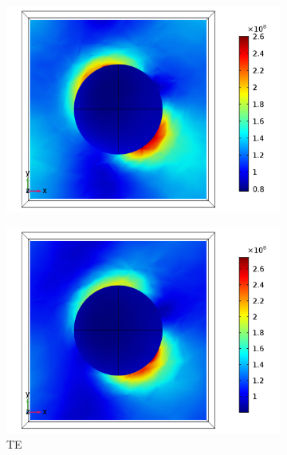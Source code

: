 \begin{figure}[htb!]
    \begin{subfigure}{0.32\textwidth}
        \centering
        \includegraphics[width=\linewidth]{figures/ch4/S5A/FieldDistribution/phi25/z2/Sample5A_TE_Slice@z=+05Rz_wl=350_phi=25.png}
   \end{subfigure}
   \begin{subfigure}{0.32\textwidth}
        \centering
        \includegraphics[width=\linewidth]{figures/ch4/S5A/FieldDistribution/phi25/z2/Sample5A_TE_Slice@z=+05Rz_wl=400_phi=25.png}
        \caption{TE}
        \vspace{-0.7cm}
   \end{subfigure}
   \begin{subfigure}{0.32\textwidth}

\end{subfigure}
\end{figure}
